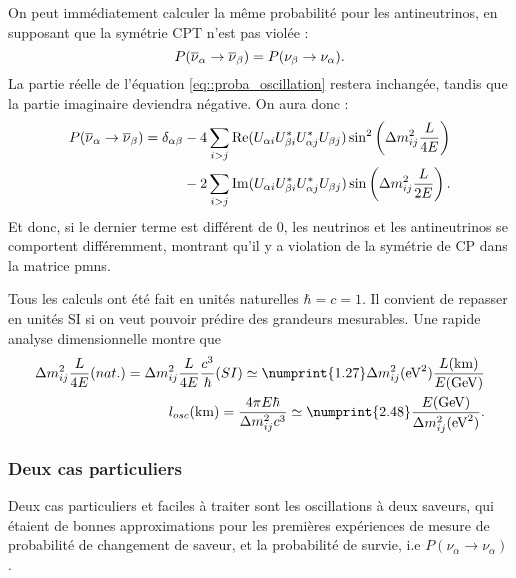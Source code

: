         On peut immédiatement calculer la même probabilité pour les antineutrinos, en supposant que la symétrie CPT n'est pas violée : 
        \begin{equation}
          P(\overline{\nu}_{\alpha}\to\overline{\nu}_{\beta}) = P(\nu_{\beta}\to\nu_{\alpha}).
        \end{equation}
        La partie réelle de l'équation \eqref{eq::proba_oscillation} restera inchangée, tandis que la partie imaginaire deviendra négative. On aura donc :
        \begin{equation}
          \begin{split}
            P(\overline{\nu}_{\alpha}\to\overline{\nu}_{\beta}) = \delta_{\alpha\beta} & - 4\sum_{i>j}\Re(U_{\alpha i}U_{\beta i}^*U_{\alpha j}^*U_{\beta j})\sin^2\left(\Delta m_{ij}^2\frac{L}{4E}\right) \\
            & -2\sum_{i>j}\Im(U_{\alpha i}U_{\beta i}^*U_{\alpha j}^*U_{\beta j})\sin\left(\Delta m_{ij}^2\frac{L}{2E}\right).
          \end{split}
        \end{equation}
        Et donc, si le dernier terme est différent de 0, les neutrinos et les antineutrinos se comportent différemment, montrant qu'il y a violation de la symétrie de CP dans la matrice \gls{pmns}.
        
        Tous les calculs ont été fait en unités naturelles $\hbar = c = 1$. Il convient de repasser en unités SI si on veut pouvoir prédire des grandeurs mesurables. Une rapide analyse dimensionnelle montre que 
        \begin{eqnarray}
          \Delta m_{ij}^2\frac{L}{4E}(nat.)
          = \Delta m_{ij}^2\frac{L}{4E}\frac{c^3}{\hbar}(SI)
          \simeq \numprint{1.27}\Delta m_{ij}^2(\si{\electronvolt\squared})\frac{L(\si{\kilo\meter})}{E(\si{\giga\electronvolt})} \\ 
          l_{osc}(\si{\kilo\meter}) = \frac{4\pi E\hbar}{\Delta m_{ij}^2c^3} \simeq \numprint{2.48}\frac{E(\si{\giga\electronvolt})}{\Delta m_{ij}^2(\si{\electronvolt\squared})}.
        \end{eqnarray}

      \subsubsection{Deux cas particuliers}
        Deux cas particuliers et faciles à traiter sont les oscillations à deux saveurs, qui étaient de bonnes approximations pour les premières expériences de mesure de probabilité de changement de saveur, et la probabilité de survie, i.e $P(\nu_{\alpha}\to\nu_{\alpha})$.
        
